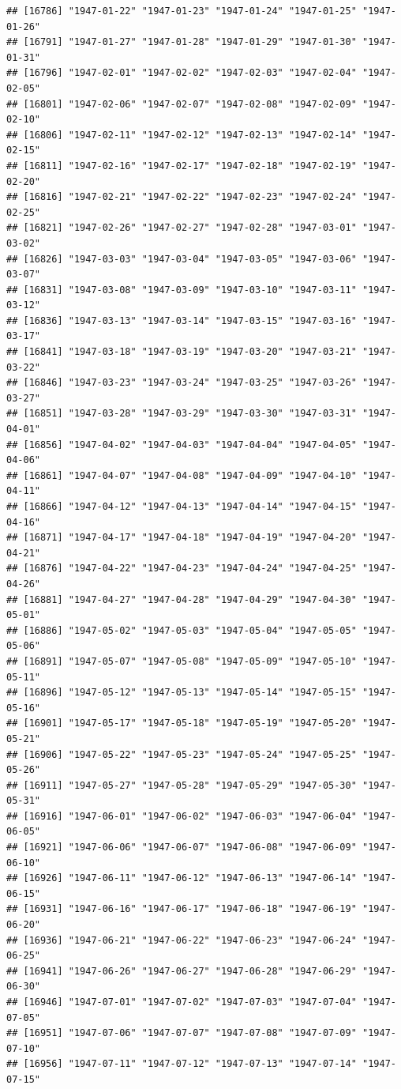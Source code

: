 \documentclass{article}\usepackage[]{graphicx}\usepackage[]{color}
\makeatletter
\newenvironment{kframe}{%
 \def\at@end@of@kframe{}%
 \ifinner\ifhmode%
  \def\at@end@of@kframe{\end{minipage}}%
  \begin{minipage}{\columnwidth}%
 \fi\fi%
 \def\FrameCommand##1{\hskip\@totalleftmargin \hskip-\fboxsep
 \colorbox{shadecolor}{##1}\hskip-\fboxsep
     \hskip-\linewidth \hskip-\@totalleftmargin \hskip\columnwidth}%
 \MakeFramed {\advance\hsize-\width
   \@totalleftmargin\z@ \linewidth\hsize
   \@setminipage}}%
 {\par\unskip\endMakeFramed%
 \at@end@of@kframe}
\newenvironment{knitrout}{}{} %
\makeatother
\begin{document}
\begin{description}
\begin{knitrout}
\begin{kframe}
\begin{verbatim}
## [16786] "1947-01-22" "1947-01-23" "1947-01-24" "1947-01-25" "1947-01-26"
## [16791] "1947-01-27" "1947-01-28" "1947-01-29" "1947-01-30" "1947-01-31"
## [16796] "1947-02-01" "1947-02-02" "1947-02-03" "1947-02-04" "1947-02-05"
## [16801] "1947-02-06" "1947-02-07" "1947-02-08" "1947-02-09" "1947-02-10"
## [16806] "1947-02-11" "1947-02-12" "1947-02-13" "1947-02-14" "1947-02-15"
## [16811] "1947-02-16" "1947-02-17" "1947-02-18" "1947-02-19" "1947-02-20"
## [16816] "1947-02-21" "1947-02-22" "1947-02-23" "1947-02-24" "1947-02-25"
## [16821] "1947-02-26" "1947-02-27" "1947-02-28" "1947-03-01" "1947-03-02"
## [16826] "1947-03-03" "1947-03-04" "1947-03-05" "1947-03-06" "1947-03-07"
## [16831] "1947-03-08" "1947-03-09" "1947-03-10" "1947-03-11" "1947-03-12"
## [16836] "1947-03-13" "1947-03-14" "1947-03-15" "1947-03-16" "1947-03-17"
## [16841] "1947-03-18" "1947-03-19" "1947-03-20" "1947-03-21" "1947-03-22"
## [16846] "1947-03-23" "1947-03-24" "1947-03-25" "1947-03-26" "1947-03-27"
## [16851] "1947-03-28" "1947-03-29" "1947-03-30" "1947-03-31" "1947-04-01"
## [16856] "1947-04-02" "1947-04-03" "1947-04-04" "1947-04-05" "1947-04-06"
## [16861] "1947-04-07" "1947-04-08" "1947-04-09" "1947-04-10" "1947-04-11"
## [16866] "1947-04-12" "1947-04-13" "1947-04-14" "1947-04-15" "1947-04-16"
## [16871] "1947-04-17" "1947-04-18" "1947-04-19" "1947-04-20" "1947-04-21"
## [16876] "1947-04-22" "1947-04-23" "1947-04-24" "1947-04-25" "1947-04-26"
## [16881] "1947-04-27" "1947-04-28" "1947-04-29" "1947-04-30" "1947-05-01"
## [16886] "1947-05-02" "1947-05-03" "1947-05-04" "1947-05-05" "1947-05-06"
## [16891] "1947-05-07" "1947-05-08" "1947-05-09" "1947-05-10" "1947-05-11"
## [16896] "1947-05-12" "1947-05-13" "1947-05-14" "1947-05-15" "1947-05-16"
## [16901] "1947-05-17" "1947-05-18" "1947-05-19" "1947-05-20" "1947-05-21"
## [16906] "1947-05-22" "1947-05-23" "1947-05-24" "1947-05-25" "1947-05-26"
## [16911] "1947-05-27" "1947-05-28" "1947-05-29" "1947-05-30" "1947-05-31"
## [16916] "1947-06-01" "1947-06-02" "1947-06-03" "1947-06-04" "1947-06-05"
## [16921] "1947-06-06" "1947-06-07" "1947-06-08" "1947-06-09" "1947-06-10"
## [16926] "1947-06-11" "1947-06-12" "1947-06-13" "1947-06-14" "1947-06-15"
## [16931] "1947-06-16" "1947-06-17" "1947-06-18" "1947-06-19" "1947-06-20"
## [16936] "1947-06-21" "1947-06-22" "1947-06-23" "1947-06-24" "1947-06-25"
## [16941] "1947-06-26" "1947-06-27" "1947-06-28" "1947-06-29" "1947-06-30"
## [16946] "1947-07-01" "1947-07-02" "1947-07-03" "1947-07-04" "1947-07-05"
## [16951] "1947-07-06" "1947-07-07" "1947-07-08" "1947-07-09" "1947-07-10"
## [16956] "1947-07-11" "1947-07-12" "1947-07-13" "1947-07-14" "1947-07-15"

\end{verbatim}
\end{kframe}
\end{knitrout}
\end{description}
\end{document}
